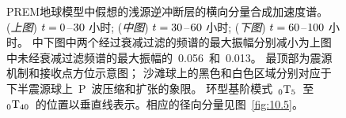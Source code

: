 \begin{figure}
\begin{center}
{}
\end{center}
\caption[thrust spect1]{
\label{fig:10.3}
PREM地球模型中假想的浅源逆冲断层的横向分量合成加速度谱。
({\em 上图\/}) $t=0\hspace{0.2 mm}$--$\hspace{0.2 mm}30$
小时; 
({\em 中图\/}) $t=30\hspace{0.2 mm}$--$\hspace{0.2 mm}60$
小时; 
({\em 下图\/}) $t=60\hspace{0.2 mm}$--$\hspace{0.2 mm}100$
小时。
中下图中两个经过衰减过滤的频谱的最大振幅分别减小为上图中未经衰减过滤频谱的最大振幅的~0.056~和~0.013。
最顶部为震源机制和接收点方位示意图；
沙滩球上的黑色和白色区域分别对应于下半震源球上~P~波压缩和扩张的象限。
环型基阶模式~${}_0{\rm T}_5$~至~${}_0{\rm T}_{40}$~的位置以垂直线表示。相应的径向分量见图~\protect\ref{fig:10.5}。}
\end{figure}

